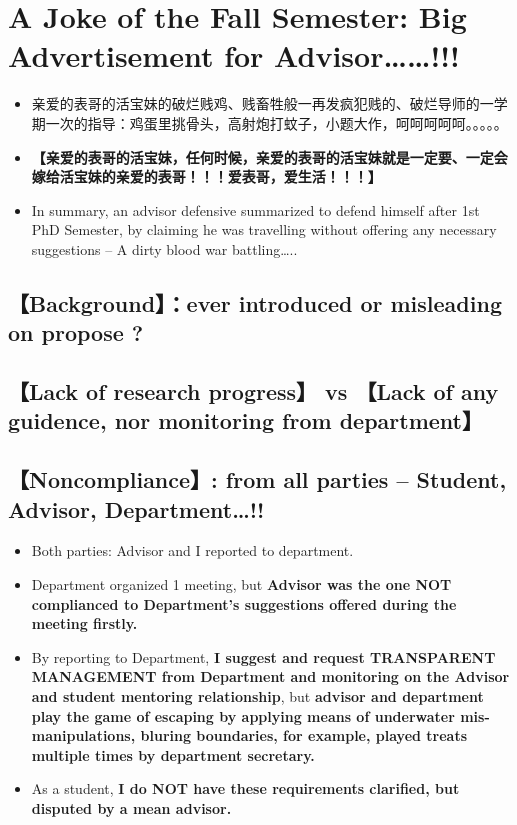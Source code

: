 \documentclass[9pt, b5paper]{article}
\begin{document}
\section{A Joke of the Fall Semester: Big Advertisement for Advisor\ldots{}\ldots{}!!!}
\label{sec-3}
\begin{itemize}
\item 亲爱的表哥的活宝妹的破烂贱鸡、贱畜牲般一再发疯犯贱的、破烂导师的一学期一次的指导：鸡蛋里挑骨头，高射炮打蚊子，小题大作，呵呵呵呵呵。。。。。
\item \textbf{【亲爱的表哥的活宝妹，任何时候，亲爱的表哥的活宝妹就是一定要、一定会嫁给活宝妹的亲爱的表哥！！！爱表哥，爱生活！！！】}
\item In summary, an advisor defensive summarized to defend himself after 1st PhD Semester, by claiming he was travelling without offering any necessary suggestions -- A dirty blood war battling\ldots{}..
\end{itemize}
\subsection{【Background】：ever introduced or misleading on propose ?}
\label{sec-3-1}

\subsection{【Lack of research progress】 vs 【Lack of any guidence, nor monitoring from department】}
\label{sec-3-2}

\subsection{【Noncompliance】: from all parties -- Student, Advisor, Department\ldots{}!!}
\label{sec-3-3}
\begin{itemize}
\item Both parties: Advisor and I reported to department.
\item Department organized 1 meeting, but \textbf{Advisor was the one NOT complianced to Department's suggestions offered during the meeting firstly.}
\item By reporting to Department, \textbf{I suggest and request TRANSPARENT MANAGEMENT from Department and monitoring on the Advisor and student mentoring relationship}, but \textbf{advisor and department play the game of escaping by applying means of underwater mis-manipulations, bluring boundaries, for example, played treats multiple times by department secretary.}
\item As a student, \textbf{I do NOT have these requirements clarified, but disputed by a mean advisor.}
\end{itemize}
\end{document}
